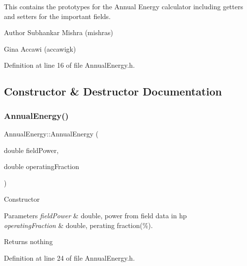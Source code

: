 This contains the prototypes for the Annual Energy calculator including getters and setters for the important fields.

\begin{DoxyAuthor}{Author}
Subhankar Mishra (mishras) 

Gina Accawi (accawigk) 
\end{DoxyAuthor}


Definition at line 16 of file Annual\+Energy.\+h.



\subsection{Constructor \& Destructor Documentation}
\mbox{\label{class_annual_energy_a5e446ce85879bafeac8fc992cb5b9ed7}} 
\subsubsection{\texorpdfstring{Annual\+Energy()}{AnnualEnergy()}\hspace{0.1cm}{\footnotesize\ttfamily [1/3]}}
{\footnotesize\ttfamily Annual\+Energy\+::\+Annual\+Energy (\begin{DoxyParamCaption}\item[{double}]{field\+Power,  }\item[{double}]{operating\+Fraction }\end{DoxyParamCaption})\hspace{0.3cm}{\ttfamily [inline]}}

Constructor 
\begin{DoxyParams}{Parameters}
{\em field\+Power} & double, power from field data in hp \\
\hline
{\em operating\+Fraction} & double, perating fraction(\%). \\
\hline
\end{DoxyParams}
\begin{DoxyReturn}{Returns}
nothing 
\end{DoxyReturn}


Definition at line 24 of file Annual\+Energy.\+h.

\mbox{\label{class_annual_energy_a5e446ce85879bafeac8fc992cb5b9ed7}} 
